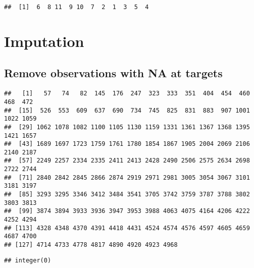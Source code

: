\documentclass[]{article}
\newenvironment{Shaded}{\begin{snugshade}}{\end{snugshade}}
\newcommand{\KeywordTok}[1]{\textcolor[rgb]{0.13,0.29,0.53}{\textbf{{#1}}}}
\newcommand{\DecValTok}[1]{\textcolor[rgb]{0.00,0.00,0.81}{{#1}}}
\newcommand{\NormalTok}[1]{{#1}}
\begin{document}
\begin{verbatim}
##  [1]  6  8 11  9 10  7  2  1  3  5  4
\end{verbatim}

\section{Imputation}\label{imputation}

\subsection{Remove observations with NA at
targets}\label{remove-observations-with-na-at-targets}

\begin{Shaded}
\end{Shaded}

\begin{verbatim}
##   [1]   57   74   82  145  176  247  323  333  351  404  454  460  468  472
##  [15]  526  553  609  637  690  734  745  825  831  883  907 1001 1022 1059
##  [29] 1062 1078 1082 1100 1105 1130 1159 1331 1361 1367 1368 1395 1421 1657
##  [43] 1689 1697 1723 1759 1761 1780 1854 1867 1905 2004 2069 2106 2140 2187
##  [57] 2249 2257 2334 2335 2411 2413 2428 2490 2506 2575 2634 2698 2722 2744
##  [71] 2840 2842 2845 2866 2874 2919 2971 2981 3005 3054 3067 3101 3181 3197
##  [85] 3293 3295 3346 3412 3484 3541 3705 3742 3759 3787 3788 3802 3803 3813
##  [99] 3874 3894 3933 3936 3947 3953 3988 4063 4075 4164 4206 4222 4252 4294
## [113] 4328 4348 4370 4391 4418 4431 4524 4574 4576 4597 4605 4659 4687 4700
## [127] 4714 4733 4778 4817 4890 4920 4923 4968
\end{verbatim}

\begin{Shaded}
\end{Shaded}

\begin{verbatim}
## integer(0)
\end{verbatim}
\end{document}
